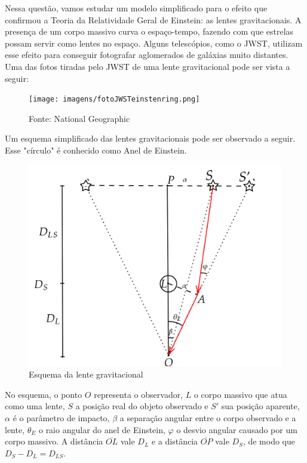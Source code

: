 \documentclass[11pt]{article}
\begin{document}
\begin{pproblem}
    Nessa questão, vamos estudar um modelo simplificado para o efeito que confirmou a Teoria da Relatividade Geral de Einstein: as lentes gravitacionais. A presença de um corpo massivo curva o espaço-tempo, fazendo com que estrelas possam servir como lentes no espaço. Alguns telescópios, como o JWST, utilizam esse efeito para conseguir fotografar aglomerados de galáxias muito distantes. Uma das fotos tiradas pelo JWST de uma lente gravitacional pode ser vista a seguir:
    \begin{figure}[H]
        \centering
        \texttt{[image: imagens/fotoJWSTeinstenring.png]}
        \caption{Fonte: National Geographic}
    \end{figure} 

    Um esquema simplificado das lentes gravitacionais pode ser observado a seguir. Esse "círculo" é conhecido como Anel de Einstein.
    \begin{figure}[H]
        \centering
        \includegraphics[width=0.9\linewidth]{imagens/anelE.png}
        \caption{Esquema da lente gravitacional}
    \end{figure}
    No esquema, o ponto \(O\) representa o observador, \(L\) o corpo massivo que atua como uma lente, \(S\) a posição real do objeto observado e \(S'\) sua posição aparente, \(\alpha\) é o parâmetro de impacto, \(\beta\) a separação angular entre o corpo observado e a lente, \(\theta_E\) o raio angular do anel de Einstein, \(\varphi\) o desvio angular causado por um corpo massivo. A distância \(\overline{OL}\) vale \(D_L\) e a distância \(\overline{OP}\) vale \(D_S\), de modo que \(D_S-D_L = D_{LS}\).


\end{pproblem}
\end{document}
